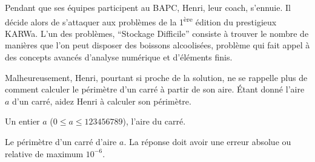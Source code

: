 \problemname{\problemyamlname}


\newcommand{\maxa}{123456789}

Pendant que ses équipes participent au BAPC, Henri, leur coach, s'ennuie.
Il décide alors de s'attaquer aux problèmes de la 1\textsuperscript{ère} édition du prestigieux KARWa.
L'un des problèmes, ``Stockage Difficile'' consiste à trouver le nombre de manières que l'on peut disposer des boissons alcoolisées, problème qui fait appel à des concepts avancés d'analyse numérique et d'éléments finis.

Malheureusement, Henri, pourtant si proche de la solution, ne se rappelle plus de comment calculer le périmètre d'un carré à partir de son aire.
Étant donné l'aire $a$ d'un carré, aidez Henri à calculer son périmètre.

\begin{Input}
	Un entier $a$ ($0 \le a \le \maxa$), l'aire du carré.
\end{Input}

\begin{Output}
	Le périmètre d'un carré d'aire $a$.
	La réponse doit avoir une erreur absolue ou relative de maximum $10^{-6}$.
\end{Output}
